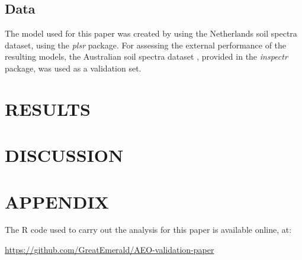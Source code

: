 \documentclass{isprs}
\begin{document}
\subsection{Data}\label{sec:Data}

The model used for this paper was created by using the Netherlands soil spectra dataset, using the \textit{plsr} package. For assessing the external performance of the resulting models, the Australian soil spectra dataset \cite{rossel2010using}, provided in the \textit{inspectr} package, was used as a validation set.

\section{RESULTS}\label{sec:RESULTS}


\section{DISCUSSION}\label{sec:DISCUSSION}

{%
	\begin{spacing}{0.9}%
		
	\end{spacing}
}

\section*{APPENDIX}\label{APPENDIX}

The R code used to carry out the analysis for this paper is available online, at:

\url{https://github.com/GreatEmerald/AEO-validation-paper}
\end{document}
